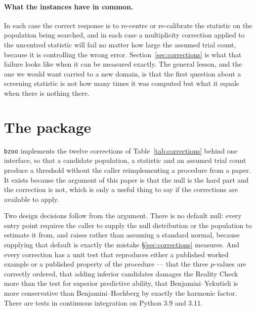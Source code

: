 \documentclass{article}
\begin{document}
\paragraph{What the instances have in common.} In each case the correct
response is to re-centre or re-calibrate the statistic on the population being
searched, and in each case a multiplicity correction applied to the uncentred
statistic will fail no matter how large the assumed trial count, because it is
controlling the wrong error. Section~\ref{sec:corrections} is what that failure
looks like when it can be measured exactly. The general lesson, and the one we
would want carried to a new domain, is that the first question about a
screening statistic is not how many times it was computed but what it equals
when there is nothing there.

\section{The package}
\label{sec:package}



\texttt{bzoo} implements the twelve corrections of
Table~\ref{tab:corrections} behind one interface, so that a candidate
population, a statistic and an assumed trial count produce a threshold without
the caller reimplementing a procedure from a paper. It exists because the
argument of this paper is that the null is the hard part and the correction is
not, which is only a useful thing to say if the corrections are available to
apply.

Two design decisions follow from the argument. There is no default null: every
entry point requires the caller to supply the null distribution or the
population to estimate it from, and raises rather than assuming a standard
normal, because supplying that default is exactly the mistake
\S\ref{sec:corrections} measures. And every correction has a unit test that
reproduces either a published worked example or a published property of the
procedure --- that the three \citet{hansen2005} $p$-values are correctly
ordered, that adding inferior candidates damages the Reality Check more than
the test for superior predictive ability, that Benjamini--Yekutieli is more
conservative than Benjamini--Hochberg by exactly the harmonic factor. There are
\bzootestCount{} tests in continuous integration on Python 3.9 and 3.11.

\end{document}

